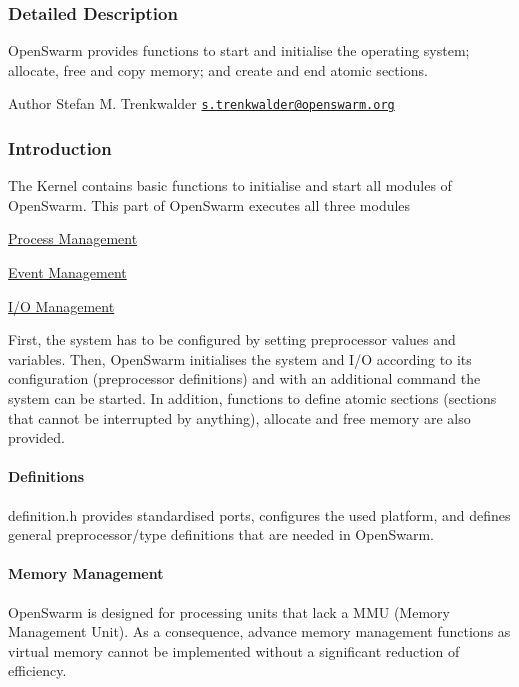 \subsubsection{Detailed Description}
Open\+Swarm provides functions to start and initialise the operating system; allocate, free and copy memory; and create and end atomic sections. 

\begin{DoxyAuthor}{Author}
Stefan M. Trenkwalder \href{mailto:s.trenkwalder@openswarm.org}{\tt s.\+trenkwalder@openswarm.\+org}
\end{DoxyAuthor}
\hypertarget{group__base_sec_intro_base}{}\subsubsection{Introduction}\label{group__base_sec_intro_base}
The Kernel contains basic functions to initialise and start all modules of Open\+Swarm. This part of Open\+Swarm executes all three modules
\begin{DoxyEnumerate}
\item \hyperlink{group__process}{Process Management}
\item \hyperlink{group__events}{Event Management}
\item \hyperlink{group__io}{I/\+O Management}
\end{DoxyEnumerate}

First, the system has to be configured by setting preprocessor values and variables. Then, Open\+Swarm initialises the system and I/\+O according to its configuration (preprocessor definitions) and with an additional command the system can be started. In addition, functions to define atomic sections (sections that cannot be interrupted by anything), allocate and free memory are also provided.\hypertarget{group__base_ssec_intro_base_defs}{}\paragraph{Definitions}\label{group__base_ssec_intro_base_defs}
definition.\+h provides standardised ports, configures the used platform, and defines general preprocessor/type definitions that are needed in Open\+Swarm.\hypertarget{group__base_ssec_intro_base_mem}{}\paragraph{Memory Management}\label{group__base_ssec_intro_base_mem}
Open\+Swarm is designed for processing units that lack a M\+M\+U (Memory Management Unit). As a consequence, advance memory management functions as virtual memory cannot be implemented without a significant reduction of efficiency.

